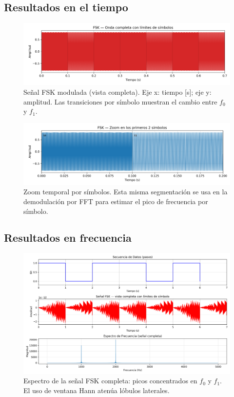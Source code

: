 \documentclass[letter,12pt]{article}
\begin{document}
\subsection{Resultados en el tiempo}
\begin{figure}[H]
  \centering
  \includegraphics[width=0.95\linewidth]{../Codigo_Fuente/figs/fsk_waveform_full.png}
  \caption{Señal FSK modulada (vista completa). Eje x: tiempo [s]; eje y: amplitud. Las transiciones por símbolo muestran el cambio entre \(f_0\) y \(f_1\).}
  \label{fig:mod-tiempo}
\end{figure}

\begin{figure}[H]
  \centering
  \includegraphics[width=0.95\linewidth]{../Codigo_Fuente/figs/fsk_waveform_zoom.png}
  \caption{Zoom temporal por símbolos. Esta misma segmentación se usa en la demodulación por FFT para estimar el pico de frecuencia por símbolo.}
  \label{fig:demod-tiempo}
\end{figure}

\subsection{Resultados en frecuencia}
\begin{figure}[H]
  \centering
  \includegraphics[width=0.95\linewidth]{../Codigo_Fuente/figs/fsk_demo_overview.png}
  \caption{Espectro de la señal FSK completa: picos concentrados en \(f_0\) y \(f_1\). El uso de ventana Hann atenúa lóbulos laterales.}
  \label{fig:mod-freq}
\end{figure}
\end{document}
